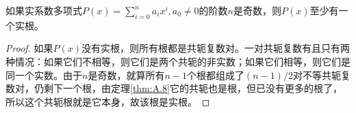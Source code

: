 \documentclass[../main.tex]{subfiles}
\begin{document}
\begin{corollary}
    如果实系数多项式$P\left(x\right)=\sum_{i=0}^n a_ix^i,a_0\neq 0$的阶数$n$是奇数，则$P\left(x\right)$至少有一个实根。
\end{corollary}
\begin{proof}
    如果$P\left(x\right)$没有实根，则所有根都是共轭复数对。一对共轭复数有且只有两种情况：如果它们不相等，则它们是两个共轭的非实数；如果它们相等，则它们是同一个实数。由于$n$是奇数，就算所有$n-1$个根都组成了$\left(n-1\right)/2$对不等共轭复数对，仍剩下一个根，由定理\ref{thm:A.8}它的共轭也是根，但已没有更多的根了，所以这个共轭根就是它本身，故该根是实根。
\end{proof}
\end{document}
